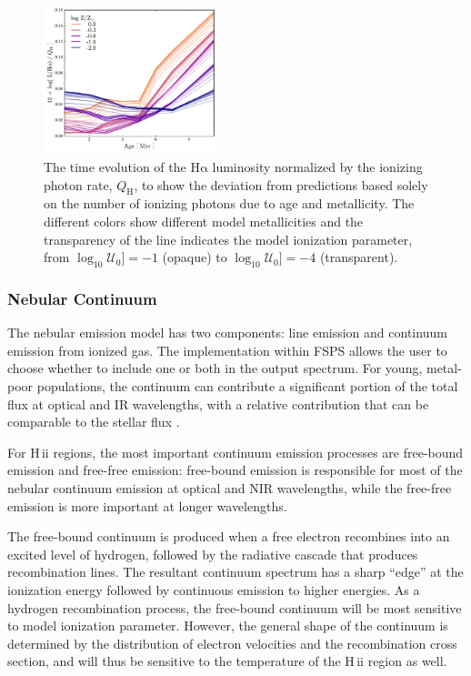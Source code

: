 \documentclass[trackchanges, twocolumn, tighten]{aastex61}
\newcommand{\FSPS}{{\sc FSPS}\xspace}
\newcommand{\logten}{\ensuremath{\log_{10}}}
\newcommand{\ha}{\ensuremath{\mathrm{H\alpha}}}
\newcommand{\hii}{H\,{\sc ii}\xspace}
\newcommand{\QH}{\ensuremath{Q_{\mathrm{H}}}}
\newcommand{\logU}{\ensuremath{\logten \mathcal{U}_0}}
\begin{document}
\begin{figure} %
  \begin{centering}
    \includegraphics[width=0.45\textwidth]{f9.pdf}
    \caption{The time evolution of the \ha{} luminosity normalized by the ionizing photon rate, \QH{}, to show the deviation from predictions based solely on the number of ionizing photons due to age and metallicity. The different colors show different model metallicities and the transparency of the line indicates the model ionization parameter, from $\logU]=-1$ (opaque) to $\logU]=-4$ (transparent).}
    \label{fig:RecLines}
  \end{centering}
\end{figure}

\subsubsection{Nebular Continuum}\label{sec:models:continuum}

The nebular emission model has two components: line emission and continuum emission from ionized gas. The implementation within \FSPS allows the user to choose whether to include one or both in the output spectrum. For young, metal-poor populations, the continuum can contribute a significant portion of the total flux at optical and IR wavelengths, with a relative contribution that can be comparable to the stellar flux \citep[e.g.,][]{Reines10}. 

For \hii regions, the most important continuum emission processes are free-bound emission and free-free emission: free-bound emission is responsible for most of the nebular continuum emission at optical and NIR wavelengths, while the free-free emission is more important at longer wavelengths. 

The free-bound continuum is produced when a free electron recombines into an excited level of hydrogen, followed by the radiative cascade that produces recombination lines. The resultant continuum spectrum has a sharp ``edge'' at the ionization energy followed by continuous emission to higher energies. As a hydrogen recombination process, the free-bound continuum will be most sensitive to model ionization parameter. However, the general shape of the continuum is determined by the distribution of electron velocities and the recombination cross section, and will thus be sensitive to the temperature of the \hii region as well.
\end{document}
